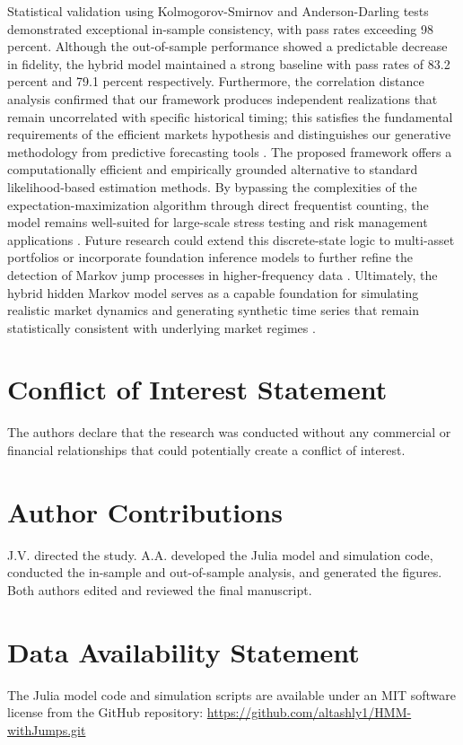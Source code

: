 \documentclass[11pt, letterpaper]{article}
\begin{document}
Statistical validation using Kolmogorov-Smirnov and Anderson-Darling tests demonstrated exceptional in-sample consistency, with pass rates exceeding 98 percent. Although the out-of-sample performance showed a predictable decrease in fidelity, the hybrid model maintained a strong baseline with pass rates of 83.2 percent and 79.1 percent respectively. Furthermore, the correlation distance analysis confirmed that our framework produces independent realizations that remain uncorrelated with specific historical timing; this satisfies the fundamental requirements of the efficient markets hypothesis and distinguishes our generative methodology from predictive forecasting tools \cite{fama_efficient_1970, assefa_generating_2021, kwon_can_2024}. The proposed framework offers a computationally efficient and empirically grounded alternative to standard likelihood-based estimation methods. By bypassing the complexities of the expectation-maximization algorithm through direct frequentist counting, the model remains well-suited for large-scale stress testing and risk management applications \cite{ohara_market_1998, manganelli_2004, glasserman_monte_2003}. Future research could extend this discrete-state logic to multi-asset portfolios or incorporate foundation inference models to further refine the detection of Markov jump processes in higher-frequency data \cite{dias_mixture_2010, berghaus_foundation_2025}. Ultimately, the hybrid hidden Markov model serves as a capable foundation for simulating realistic market dynamics and generating synthetic time series that remain statistically consistent with underlying market regimes \cite{nguyen_hidden_2018, hamilton_regime_2018}.

\section*{Conflict of Interest Statement}
The authors declare that the research was conducted without any commercial or financial relationships that could potentially create a conflict of interest.

\section*{Author Contributions}
J.V. directed the study. A.A. developed the Julia model and simulation code, conducted the in-sample and out-of-sample analysis, and generated the figures. Both authors edited and reviewed the final manuscript.

\section*{Data Availability Statement}
The Julia model code and simulation scripts are available under an MIT software license from the GitHub repository: \url{https://github.com/altashly1/HMM-withJumps.git}
\end{document}
